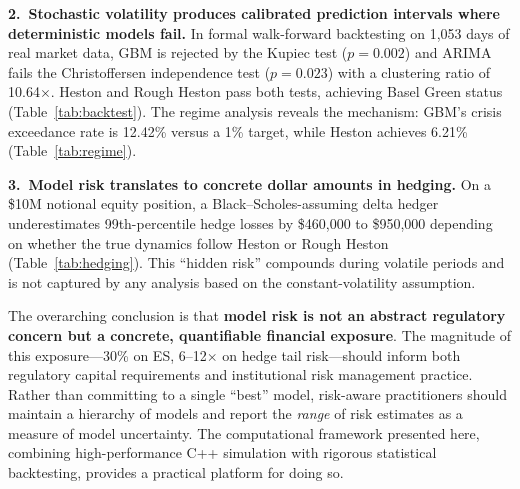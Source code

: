 \documentclass[11pt,a4paper]{article}
\begin{document}
\textbf{2.\ Stochastic volatility produces calibrated prediction intervals where deterministic models fail.}
In formal walk-forward backtesting on 1{,}053 days of real market data, GBM is rejected by the Kupiec test ($p = 0.002$) and ARIMA fails the Christoffersen independence test ($p = 0.023$) with a clustering ratio of 10.64$\times$.
Heston and Rough Heston pass both tests, achieving Basel Green status (Table~\ref{tab:backtest}).
The regime analysis reveals the mechanism: GBM's crisis exceedance rate is 12.42\% versus a 1\% target, while Heston achieves 6.21\% (Table~\ref{tab:regime}).

\textbf{3.\ Model risk translates to concrete dollar amounts in hedging.}
On a \$10M notional equity position, a Black--Scholes-assuming delta hedger underestimates 99th-percentile hedge losses by \$460{,}000 to \$950{,}000 depending on whether the true dynamics follow Heston or Rough Heston (Table~\ref{tab:hedging}).
This ``hidden risk'' compounds during volatile periods and is not captured by any analysis based on the constant-volatility assumption.

The overarching conclusion is that \textbf{model risk is not an abstract regulatory concern but a concrete, quantifiable financial exposure}.
The magnitude of this exposure---30\% on ES, 6--12$\times$ on hedge tail risk---should inform both regulatory capital requirements and institutional risk management practice.
Rather than committing to a single ``best'' model, risk-aware practitioners should maintain a hierarchy of models and report the \emph{range} of risk estimates as a measure of model uncertainty.
The computational framework presented here, combining high-performance C++ simulation with rigorous statistical backtesting, provides a practical platform for doing so.




\end{document}
